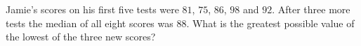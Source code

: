 Jamie's scores on his first five tests were $81$, $75$, $86$, $98$ and $92$. After three more tests the median of all eight scores was $88$. What is the greatest possible value of the lowest of the three new scores?
